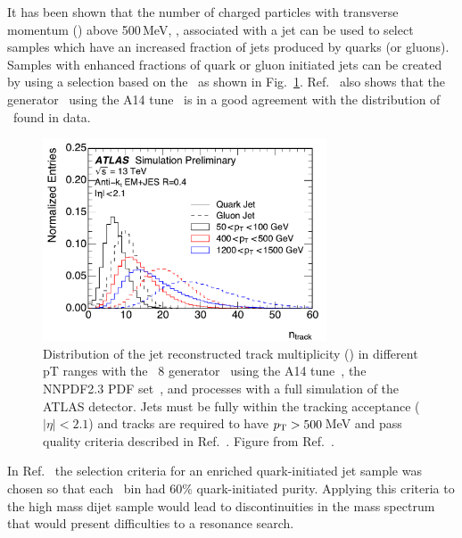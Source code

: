 
It has been shown that the number of charged particles with transverse
momentum (\pT ) above 500\,MeV, \ntrk, associated with a jet can be used
to select samples which have an increased fraction of jets produced by
quarks (or gluons). Samples with enhanced fractions of quark or gluon
initiated jets can be created by using a selection based on the \ntrk\
as shown in Fig.~\ref{fig:jet_pt_quark_gluon}.
Ref.~\cite{ATL-PHYS-PUB-2017-009} also shows that the 
generator~\cite{pythia8} using the A14 tune~\cite{A14tune} is in a good
agreement with the distribution of \ntrk\ found in data.


\begin{figure}[htb]
 \centering
\includegraphics[width=0.75\textwidth]{figures/tagging/fig_01_ATL-PHYS-PUB-2017-009.pdf}
\caption{Distribution of the jet reconstructed track multiplicity (\ntrk ) in
 different pT ranges with the \Pythia~8 generator~\cite{pythia8} using
 the A14 tune~\cite{A14tune}, the NNPDF2.3 PDF
 set~\cite{Carrazza:2013axa}, and processes with a full simulation of the
 ATLAS detector. Jets must be fully within the tracking acceptance
 ($|\eta|<2.1$) and tracks are required to have $p_{\mathrm T} > 500$\,MeV and pass
  quality criteria described in Ref.~\cite{ATL-PHYS-PUB-2017-009}. Figure
 from Ref.~\cite{ATL-PHYS-PUB-2017-009}. \label{fig:jet_pt_quark_gluon}}
\end{figure}

In Ref.~\cite{ATL-PHYS-PUB-2017-009}  the selection criteria for  an
enriched quark-initiated jet sample was chosen so that each \pT\ bin had
60\% quark-initiated purity. Applying this criteria to the high mass
dijet sample would lead to discontinuities in the mass spectrum that
would present difficulties to a resonance search. 

